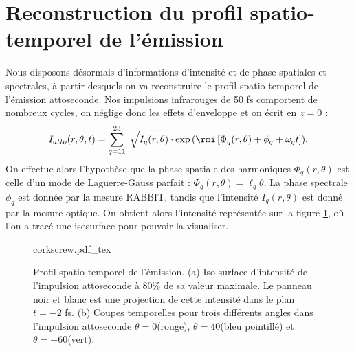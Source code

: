 \section{Reconstruction du profil spatio-temporel de l'émission}
Nous disposons désormais d'informations d'intensité et de phase spatiales et spectrales, à partir desquels on va reconstruire le profil spatio-temporel de l'émission attoseconde. Nos impulsions infrarouges de 50 fs comportent de nombreux cycles, on néglige donc les effets d'enveloppe et on écrit en $z = 0$ :
\begin{equation*}
I_{atto}(r,\theta,t) = \sum_{q=11}^{23}\;\sqrt{I_q(r,\theta)}\cdot\exp{(\rmi\left[\Phi_q(r,\theta)+\phi_q+\omega_q t\right])}.
\end{equation*}
On effectue alors l'hypothèse que la phase spatiale des harmoniques $\Phi_q(r,\theta)$ est celle d'un mode de Laguerre-Gauss parfait : $\Phi_q(r,\theta) = \ell_q \theta$. La phase spectrale $\phi_q$ est donnée par la mesure RABBIT, tandis que l'intensité $I_q(r,\theta)$ est donné par la mesure optique. On obtient alors l'intensité représentée sur la figure \ref{Fig:corkscrew}, où l'on a tracé une isosurface pour pouvoir la visualiser. 

\begin{figure}[!ht]
\centering
\def\svgwidth{\columnwidth}
{corkscrew.pdf_tex}
\caption{Profil spatio-temporel de l'émission. (a) Iso-surface d'intensité de l'impulsion attoseconde à 80\% de sa valeur maximale. Le panneau noir et blanc est une projection de cette intensité dans le plan $t=-2$ fs. (b) Coupes temporelles pour trois différents angles dans l'impulsion attoseconde $\theta=0$\degres (rouge), $\theta=40$\degres (bleu pointillé) et $\theta=-60$\degres (vert).}
\label{Fig:corkscrew}
\end{figure}

